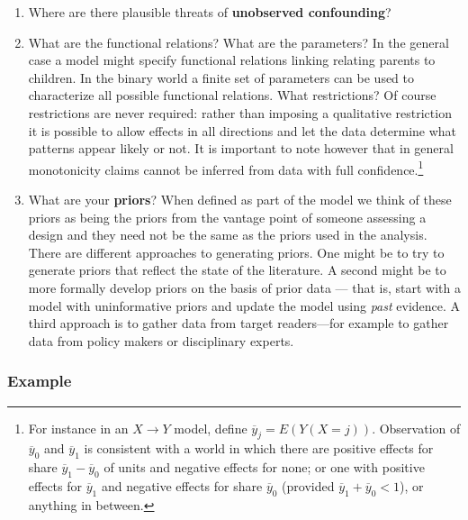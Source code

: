 \documentclass[
  12pt,
]{book}
\begin{document}
\begin{enumerate}
\def\labelenumi{\arabic{enumi}.}
\setcounter{enumi}{2}
\item
  Where are there plausible threats of \textbf{unobserved confounding}?
\item
  What are the functional relations? What are the parameters? In the general case a model might specify functional relations linking relating parents to children. In the binary world a finite set of parameters can be used to characterize all possible functional relations. What restrictions? Of course restrictions are never required: rather than imposing a qualitative restriction it is possible to allow effects in all directions and let the data determine what patterns appear likely or not. It is important to note however that in general monotonicity claims cannot be inferred from data with full confidence.\footnote{For instance in an \(X \rightarrow Y\) model, define \(\overline{y}_j = E(Y(X=j))\). Observation of \(\overline{y}_0\) and \(\overline{y}_1\) is consistent with a world in which there are positive effects for share \(\overline{y}_1 - \overline{y}_0\) of units and negative effects for none; or one with positive effects for \(\overline{y}_1\) and negative effects for share \(\overline{y}_0\) (provided \(\overline{y}_1 + \overline{y}_0 <1\)), or anything in between.}
\item
  What are your \textbf{priors}? When defined as part of the model we think of these priors as being the priors from the vantage point of someone assessing a design and they need not be the same as the priors used in the analysis. There are different approaches to generating priors. One might be to try to generate priors that reflect the state of the literature. A second might be to more formally develop priors on the basis of prior data --- that is, start with a model with uninformative priors and update the model using \emph{past} evidence. A third approach is to gather data from target readers---for example to gather data from policy makers or disciplinary experts.
\end{enumerate}

\hypertarget{example}{%
\subsubsection{Example}\label{example}}
\end{document}
